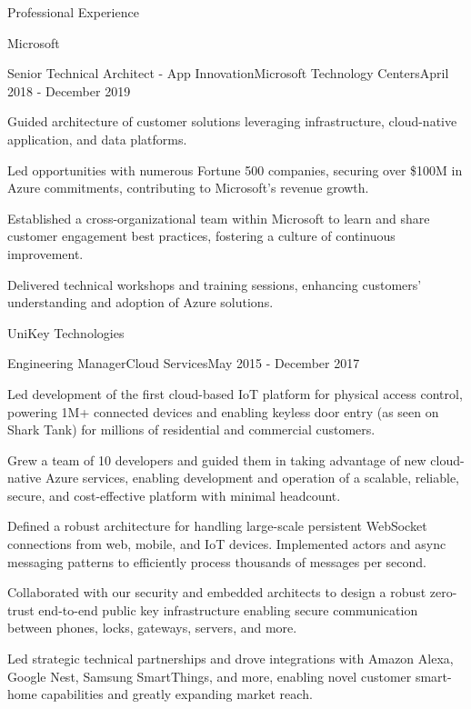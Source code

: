 \documentclass{resume} %
\begin{document}
\begin{rSection}{Professional Experience}
\begin{rCompany}{Microsoft}{}{}
    \begin{rRole}{Senior Technical Architect - App Innovation}{Microsoft Technology Centers}{April 2018 - December 2019}
        \item Guided architecture of customer solutions leveraging infrastructure, cloud-native application, and data platforms.
        \item Led opportunities with numerous Fortune 500 companies, securing over \$100M in Azure commitments, contributing to Microsoft's revenue growth.
        \item Established a cross-organizational team within Microsoft to learn and share customer engagement best practices, fostering a culture of continuous improvement.
        \item Delivered technical workshops and training sessions, enhancing customers' understanding and adoption of Azure solutions.
    \end{rRole}
  \end{rCompany}

  \begin{rCompany}{UniKey Technologies}{}{}
    \begin{rRole}{Engineering Manager}{Cloud Services}{May 2015 - December 2017}
      \item Led development of the first cloud-based IoT platform for physical access control, powering 1M+ connected devices and enabling keyless door entry (as seen on Shark Tank) for millions of residential and commercial customers.
      \item Grew a team of 10 developers and guided them in taking advantage of new cloud-native Azure services, enabling development and operation of a scalable, reliable, secure, and cost-effective platform with minimal headcount.
      \item Defined a robust architecture for handling large-scale persistent WebSocket connections from web, mobile, and IoT devices. Implemented actors and async messaging patterns to efficiently process thousands of messages per second.
      \item Collaborated with our security and embedded architects to design a robust zero-trust end-to-end public key infrastructure enabling secure communication between phones, locks, gateways, servers, and more.
      \item Led strategic technical partnerships and drove integrations with Amazon Alexa, Google Nest, Samsung SmartThings, and more, enabling novel customer smart-home capabilities and greatly expanding market reach.
    \end{rRole}
  \end{rCompany}


\end{rSection}
\end{document}
